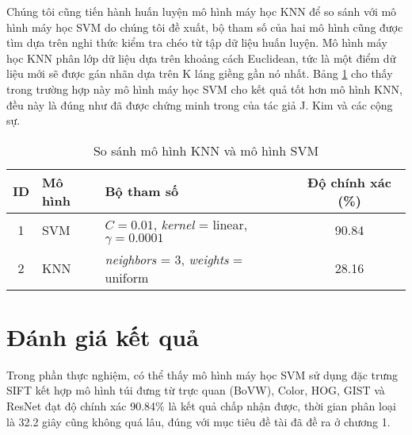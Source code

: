 Chúng tôi cũng tiến hành huấn luyện mô hình máy học KNN để so sánh với mô hình máy học SVM do chúng tôi đề xuất, bộ tham số của hai mô hình cũng được tìm dựa trên nghi thức kiểm tra chéo từ tập dữ liệu huấn luyện. Mô hình máy học KNN phân lớp dữ liệu dựa trên khoảng cách Euclidean, tức là một điểm dữ liệu mới sẽ được gán nhãn dựa trên K láng giềng gần nó nhất. Bảng \ref{tab:so-sanh-knn-svm} cho thấy trong trường hợp này mô hình máy học SVM cho kết quả tốt hơn mô hình KNN, đều này là đúng như đã được chứng minh trong \cite{kim12012comparing} của tác giả J. Kim và các cộng sự.

\begin{table}[h]
\caption{So sánh mô hình KNN và mô hình SVM}
\centering
\begin{tabular}{|c|l|l|c|}
\hline
\textbf{ID} & \textbf{Mô hình} & \textbf{Bộ tham số} & \textbf{Độ chính xác (\%)} \\ [0.5ex] \hline \hline
1 & SVM & $C = 0.01$, \emph{kernel} = linear, $\gamma = 0.0001$ & 90.84  \\
2 & KNN & \emph{neighbors} = 3, \emph{weights} = uniform & 28.16 \\ \hline
\end{tabular}
\label{tab:so-sanh-knn-svm}
\end{table}


\section{Đánh giá kết quả}
Trong phần thực nghiệm, có thể thấy mô hình máy học SVM sử dụng đặc trưng SIFT kết hợp mô hình túi đưng từ trực quan (BoVW), Color, HOG, GIST và ResNet đạt độ chính xác 90.84\% là kết quả chấp nhận được, thời gian phân loại là 32.2 giây cũng không quá lâu, đúng với mục tiêu đề tài đã đề ra ở chương 1.